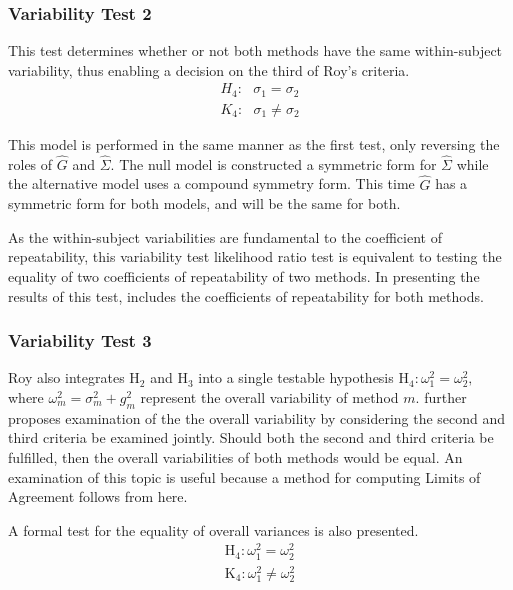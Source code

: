 \documentclass[12pt, a4paper]{report}
\theoremstyle{plain}
\theoremstyle{definition}
\theoremstyle{remark}
\begin{document}
	\subsubsection{Variability Test 2}
	
	This test determines whether or not both methods have the same within-subject variability, thus enabling a decision on the third of Roy's criteria.
	\begin{eqnarray*}
		H_{4}: \mbox{ }\sigma_{1}  = \sigma_{2} \\
		K_{4}: \mbox{ }\sigma_{1}  \neq \sigma_{2}
	\end{eqnarray*}
	
	This model is performed in the same manner as the first test, only reversing the roles of ${\hat{G}}$ and ${\hat{\Sigma}}$. The null model is constructed a symmetric form for ${\hat{\Sigma}}$ while the alternative model uses a compound symmetry form. This time ${\hat{G}}$ has a symmetric form for both models, and will be the same for both.
	
	As the within-subject variabilities are fundamental to the coefficient of repeatability, this variability test likelihood ratio test is equivalent to testing the equality of two coefficients of repeatability of two methods. In presenting the results of this test, \citet{ARoy2009} includes the coefficients of repeatability for both methods.
	
	
	\subsubsection{Variability Test 3}
	Roy also integrates $\mathrm{H}_2$ and $\mathrm{H}_3$ into a single testable hypothesis $\mathrm{H}_4\colon \omega^2_1=\omega^2_2,$ where $\omega^2_m = \sigma^2_m + g^2_m$ represent the overall variability of method $m.$ \citet{ARoy2009} further proposes examination of the the overall variability by considering the second and third criteria be examined jointly. Should both the second and third criteria be fulfilled, then the overall variabilities of both methods would be equal. An examination of this topic is useful because a method for computing Limits of Agreement follows from here.
	
	A formal test for the equality of overall variances is also presented.
	\begin{eqnarray*}
		\operatorname{H_4} : \omega^2_1 = \omega^2_2 \\
		\operatorname{K_4} : \omega^2_1 \neq \omega^2_2
	\end{eqnarray*}
	
\end{document}
